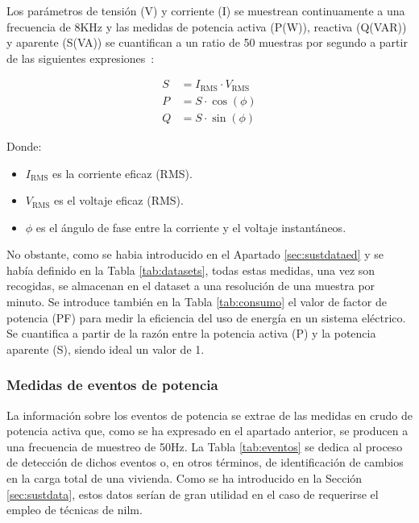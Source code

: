 \pagebreak

Los parámetros de tensión (V) y corriente (I) se muestrean continuamente a una frecuencia de 8KHz y las medidas de potencia activa (P(W)), reactiva (Q(VAR)) y aparente (S(VA)) se cuantifican a un ratio de 50 muestras por segundo a partir de las siguientes expresiones~\cite{sustdata}:

\begin{equation}
    \begin{aligned}
        S &= I_{\text{RMS}} \cdot V_{\text{RMS}} \\
        P &= S \cdot \cos(\phi) \\
        Q &= S \cdot \sin(\phi)
    \end{aligned}
\end{equation}

    Donde:
\begin{itemize}
    \renewcommand{\labelitemi}{}
    \item \( I_{\text{RMS}} \) es la corriente eficaz (RMS).
    \item \( V_{\text{RMS}} \) es el voltaje eficaz (RMS).
    \item \( \phi \) es el ángulo de fase entre la corriente y el voltaje instantáneos.
\end{itemize}

\vspace{3mm}

No obstante, como se habia introducido en el Apartado \ref{sec:sustdataed} y se había definido en la Tabla \ref{tab:datasets}, todas estas medidas, una vez son recogidas, se almacenan en el dataset a una resolución de una muestra por minuto. Se introduce también en la Tabla \ref{tab:consumo} el valor de factor de potencia (PF) para medir la eficiencia del uso de energía en un sistema eléctrico. Se cuantifica a partir de la razón entre la potencia activa (P) y la potencia aparente (S), siendo ideal un valor de 1. 

\subsubsection{Medidas de eventos de potencia}

La información sobre los eventos de potencia se extrae de las medidas en crudo de potencia activa que, como se ha expresado en el apartado anterior, se producen a una frecuencia de muestreo de 50Hz. La Tabla \ref{tab:eventos} se dedica al proceso de detección de dichos eventos o, en otros términos, de identificación de cambios en la carga total de una vivienda. Como se ha introducido en la Sección \ref{sec:sustdata}, estos datos serían de gran utilidad en el caso de requerirse el empleo de técnicas de \gls{nilm}.   


